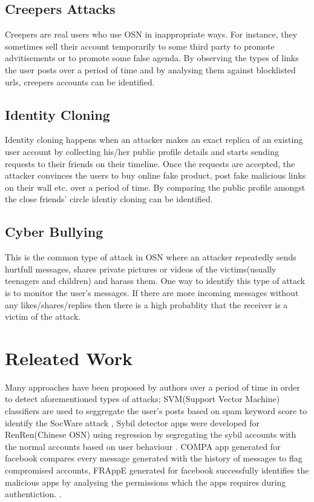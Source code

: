 \documentclass[conference]{IEEEtran}
\begin{document}
\subsection{Creepers Attacks}
Creepers are real users who use OSN in inappropriate ways. For instance, they sometimes sell their account temporarily to some third party to promote advitisements or to promote some false agenda. By observing the types of links the user posts over a period of time and by analysing them against blocklisted urls, creepers accounts can be identified.

\subsection{Identity Cloning}
Identity cloning happens when an attacker makes an exact replica of an existing user account by collecting his/her public profile details and starts sending requests to their friends on their timeline. Once the requests are accepted, the attacker convinces the users to buy online fake product, post fake malicious links on their wall etc. over a period of time. By comparing the public profile amongst the close friends' circle identiy cloning can be identified.

\subsection{Cyber Bullying}
This is the common type of attack in OSN where an attacker repeatedly sends hurtfull messages, shares private pictures or videos of the victims(usually teenagers and children) and harass them. One way to identify this type of attack is to monitor the user's messages. If there are more incoming messages without any likes/shares/replies then there is a high probablity that the receiver is a victim of the attack.

\section{Releated Work}
Many approaches have been proposed by authors over a period of time in order to detect aforementioned types of attacks; SVM(Support Vector Machine) classifiers are used to seggregate the user's posts based on spam keyword score to identify the SocWare attack \cite{1}, Sybil detector apps were developed for RenRen(Chinese OSN) using regression by segregating the sybil accounts with the normal accounts based on user behaviour \cite{2} \cite{3}. COMPA app generated for facebook compares every message generated with the history of messages to flag compromised accounts, FRAppE generated for facebook successfully identifies the malicious apps by analysing the permissions which the apps requires during authentiction. \cite{4}.
\end{document}
